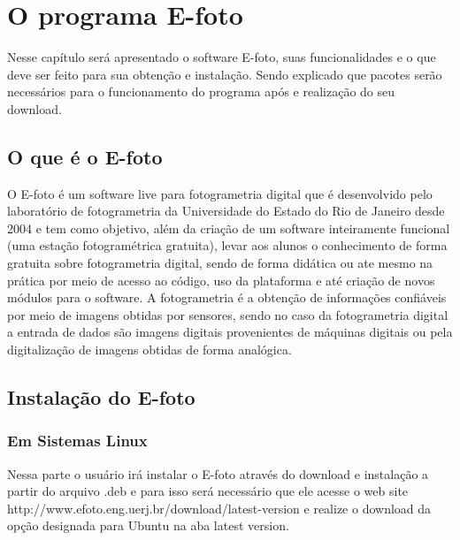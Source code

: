 \chapter{O programa E-foto}

Nesse capítulo será apresentado o software E-foto, suas funcionalidades e o que deve ser feito para sua obtenção e instalação. Sendo explicado que pacotes serão necessários para o funcionamento do programa após e realização do seu download.

\section{O que é o E-foto}

O E-foto é um software live para fotogrametria digital que é desenvolvido pelo laboratório de fotogrametria da Universidade do Estado do Rio de Janeiro desde 2004 e tem como objetivo, além da criação de um software inteiramente funcional (uma estação fotogramétrica gratuita), levar aos alunos o conhecimento de forma gratuita sobre fotogrametria digital, sendo de forma didática ou ate mesmo na prática por meio de acesso ao código, uso da plataforma e até criação de novos módulos para o software. A fotogrametria é a obtenção de informações confiáveis por meio de imagens obtidas por sensores, sendo no caso da fotogrametria digital a entrada de dados são imagens digitais provenientes de máquinas digitais ou pela digitalização de imagens obtidas de forma analógica.

\section{Instalação do E-foto}
\subsection{Em Sistemas Linux}
Nessa parte o usuário irá instalar o E-foto através do download e instalação a partir do arquivo .deb e para isso será necessário que ele acesse o web site http://www.efoto.eng.uerj.br/download/latest-version e realize o download da opção designada para Ubuntu na aba latest version.
